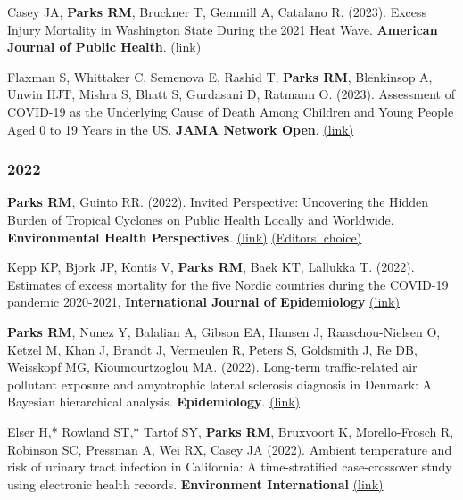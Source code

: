 \noindent Casey JA, \textbf{Parks RM}, Bruckner T, Gemmill A, Catalano R. (2023). Excess Injury Mortality in Washington State During the 2021 Heat Wave. \textbf{American Journal of Public Health}. \href{https://ajph.aphapublications.org/doi/abs/10.2105/AJPH.2023.307269}{(link)}\smallskip

\noindent Flaxman S, Whittaker C, Semenova E, Rashid T, \textbf{Parks RM}, Blenkinsop A, Unwin HJT, Mishra S, Bhatt S, Gurdasani D, Ratmann O. (2023). Assessment of COVID-19 as the Underlying Cause of Death Among Children and Young People Aged 0 to 19 Years in the US. \textbf{JAMA Network Open}. \href{https://jamanetwork.com/journals/jamanetworkopen/fullarticle/2800816}{(link)}

\subsubsection*{2022}

\noindent \textbf{Parks RM}, Guinto RR. (2022). Invited Perspective: Uncovering the Hidden Burden of Tropical Cyclones on Public Health Locally and Worldwide. \textbf{Environmental Health Perspectives}. \href{https://ehp.niehs.nih.gov/doi/10.1289/EHP12241}{(link)} \href{https://ehp.niehs.nih.gov/curated-collections/eds-choice-2022}{(Editors' choice)}  \smallskip

\noindent Kepp KP, Bjork JP, Kontis V, \textbf{Parks RM}, Baek KT, Lallukka T. (2022). Estimates of excess mortality for the five Nordic countries during the COVID-19 pandemic 2020-2021, \textbf{International Journal of Epidemiology} \href{https://academic.oup.com/ije/advance-article/doi/10.1093/ije/dyac204/6798817#379089278}{(link)} \smallskip

\noindent \textbf{Parks RM}, Nunez Y, Balalian A,  Gibson EA, Hansen J, Raaschou-Nielsen O, Ketzel M, Khan J, Brandt J, Vermeulen R, Peters S, Goldsmith J, Re DB, Weisskopf MG, Kioumourtzoglou MA. (2022). Long-term traffic-related air pollutant exposure and amyotrophic lateral sclerosis diagnosis in Denmark: A Bayesian hierarchical analysis. \textbf{Epidemiology}. \href{https://journals.lww.com/epidem/Abstract/9900/Long_term_traffic_related_air_pollutant_exposure.55.aspx}{(link)} \smallskip

\noindent Elser H,* Rowland ST,* Tartof SY, \textbf{Parks RM}, Bruxvoort K, Morello-Frosch R, Robinson SC, Pressman A, Wei RX, Casey JA (2022). Ambient temperature and risk of urinary tract infection in California: A time-stratified case-crossover study using electronic health records. \textbf{Environment International} \href{https://www.sciencedirect.com/science/article/pii/S0160412022002306}{(link)} \smallskip

